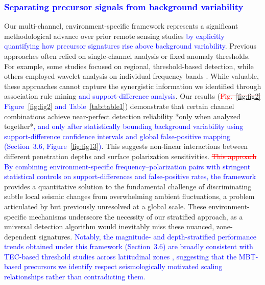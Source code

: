 \documentclass[preprint,review,12pt,authoryear]{elsarticle}
\providecommand{\DIFaddtex}[1]{{\sf #1}} %
\providecommand{\DIFdeltex}[1]{{[..\footnote{removed: #1} ]}} %
\providecommand{\DIFaddbegin}{} %
\providecommand{\DIFaddend}{} %
\providecommand{\DIFdelbegin}{} %
\providecommand{\DIFdelend}{} %
\providecommand{\DIFadd}[1]{\texorpdfstring{\DIFaddtex{#1}}{#1}} %
\providecommand{\DIFdel}[1]{\texorpdfstring{\DIFdeltex{#1}}{}} %
\newcommand{\DIFscaledelfig}{0.5}
\newlength{\DIFdelgraphicswidth} %
\newlength{\DIFdelgraphicsheight} %
\newcommand{\DIFaddincludegraphics}[2][]{{\color{blue}\fbox{\DIFOincludegraphics[#1]{#2}}}} %
\newcommand{\DIFdelincludegraphics}[2][]{%
\sbox{\DIFdelgraphicsbox}{\DIFOincludegraphics[#1]{#2}}%
\settoboxwidth{\DIFdelgraphicswidth}{\DIFdelgraphicsbox} %
\settoboxtotalheight{\DIFdelgraphicsheight}{\DIFdelgraphicsbox} %
\scalebox{\DIFscaledelfig}{%
\parbox[b]{\DIFdelgraphicswidth}{\usebox{\DIFdelgraphicsbox}\\[-\baselineskip] \rule{\DIFdelgraphicswidth}{0em}}\llap{\resizebox{\DIFdelgraphicswidth}{\DIFdelgraphicsheight}{%
\setlength{\unitlength}{\DIFdelgraphicswidth}%
\begin{picture}(1,1)%
\thicklines\linethickness{2pt} %
{\color[rgb]{1,0,0}\put(0,0){\framebox(1,1){}}}%
{\color[rgb]{1,0,0}\put(0,0){\line( 1,1){1}}}%
{\color[rgb]{1,0,0}\put(0,1){\line(1,-1){1}}}%
\end{picture}%
}\hspace*{3pt}}} %
} %
\DeclareRobustCommand{\DIFaddbegin}{\DIFOaddbegin \let\includegraphics\DIFaddincludegraphics} %
\DeclareRobustCommand{\DIFaddend}{\DIFOaddend \let\includegraphics\DIFOincludegraphics} %
\DeclareRobustCommand{\DIFdelbegin}{\DIFOdelbegin \let\includegraphics\DIFdelincludegraphics} %
\DeclareRobustCommand{\DIFdelend}{\DIFOaddend \let\includegraphics\DIFOincludegraphics} %
\renewcommand{\DIFaddtex}[1]{\textcolor{blue}{#1}}
\renewcommand{\DIFdeltex}[1]{\textcolor{red}{\sout{#1}}}
\begin{document}
\DIFaddbegin \subsubsection{\DIFadd{Separating precursor signals from background variability}}
\DIFaddend Our multi-channel, environment-specific framework represents a significant methodological advance over prior remote sensing studies \DIFaddbegin \DIFadd{by explicitly quantifying how precursor signatures rise above background variability}\DIFaddend . Previous approaches often relied on single-channel analysis or fixed anomaly thresholds. For example, some studies focused on regional, threshold-based detection, while others employed wavelet analysis on individual frequency bands \citep{liuPreearthquakeMBTAnomalies2023,wuIdentifyingSeismicAnomalies2024}. While valuable, these approaches cannot capture the synergistic information we identified through association rule mining \DIFaddbegin \DIFadd{and support-difference analysis}\DIFaddend . Our results (\DIFdelbegin \DIFdel{Fig.~\ref{fig:fig2} }\DIFdelend \DIFaddbegin \DIFadd{Figure~\ref{fig:fig2} and Table~\ref{tab:table1}}\DIFaddend ) demonstrate that certain channel combinations achieve near-perfect detection reliability *only when analyzed together*\DIFaddbegin \DIFadd{, and only after statistically bounding background variability using support-difference confidence intervals and global false-positive mapping (Section~3.6, Figure~\ref{fig:fig13})}\DIFaddend . This suggests non-linear interactions between different penetration depths and surface polarization sensitivities. \DIFdelbegin \DIFdel{This approach }\DIFdelend \DIFaddbegin \DIFadd{By combining environment-specific frequency--polarization pairs with stringent statistical controls on support-differences and false-positive rates, the framework }\DIFaddend provides a quantitative solution to the fundamental challenge of discriminating subtle local seismic changes from overwhelming ambient fluctuations, a problem articulated by \citet{maedaDiscriminationLocalFaint2008} but previously unresolved at a global scale. These environment-specific mechanisms underscore the necessity of our stratified approach, as a universal detection algorithm would inevitably miss these nuanced, zone-dependent signatures. \DIFaddbegin \DIFadd{Notably, the magnitude- and depth-stratified performance trends obtained under this framework (Section~3.6) are broadly consistent with TEC-based threshold studies across latitudinal zones \citep{shahTotalElectronContent2020}, suggesting that the MBT-based precursors we identify respect seismologically motivated scaling relationships rather than contradicting them.
}\DIFaddend 
\end{document}
